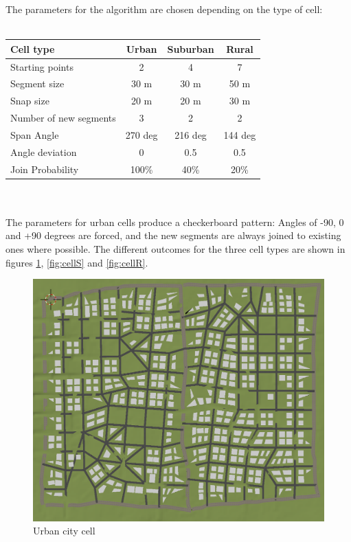 \documentclass[a4paper,12pt]{scrartcl}
\begin{document}
The parameters for the algorithm are chosen depending on the type of cell:
\\ \\
\begin{tabular}{l | c | c | c}
	\textbf{Cell type} & \textbf{Urban} & \textbf{Suburban} & \textbf{Rural} \\
	\hline 
	Starting points & 2 & 4 & 7 \\
	Segment size & 30 m & 30 m & 50 m \\
	Snap size & 20 m & 20 m & 30 m \\
	Number of new segments & 3 & 2 & 2 \\
	Span Angle & 270 deg & 216 deg & 144 deg \\
	Angle deviation & 0 & 0.5 & 0.5 \\
	Join Probability & 100\% & 40\% & 20\% \\
\end{tabular}
\\ \\
The parameters for urban cells produce a checkerboard pattern: Angles of -90, 0 and +90 degrees are forced, and the new segments are always joined to existing ones where possible. The different outcomes for the three cell types are shown in figures \ref{fig:cellU}, \ref{fig:cellS} and \ref{fig:cellR}.

\begin{figure}[h]
\center
\includegraphics[width=\textwidth]{cellU.png}
\caption{Urban city cell}
\label{fig:cellU}
\end{figure}
\end{document}
